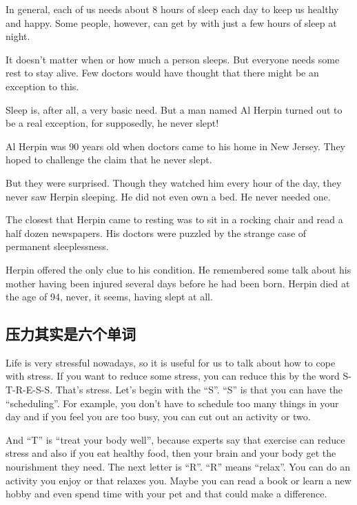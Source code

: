 In general, each of us needs about 8 hours of sleep each
day to keep us healthy and happy. Some people, however,
can get by with just a few hours of sleep at night.

It doesn't matter when or how much a person sleeps.
But everyone needs some rest to stay alive. Few doctors
would have thought that there might be an exception to this.

Sleep is, after all, a very basic need. But a man named Al
Herpin turned out to be a real exception, for supposedly,
he never slept!

Al Herpin was 90 years old when doctors
came to his home in New Jersey. They hoped to challenge
the claim that he never slept.

But they were surprised. Though they watched him every
hour of the day, they never saw Herpin sleeping. He did
not even own a bed. He never needed one.

The closest that Herpin came to resting was to sit in a
rocking chair and read a half dozen newspapers. His
doctors were puzzled by the strange case of permanent
sleeplessness.

Herpin offered the only clue to his condition. He remembered
some talk about his mother having been injured
several days before he had been born.
Herpin died at the age of 94, never, it seems, having slept
at all.
\subsection{压力其实是六个单词}
\begin{margintable}\vspace{-2cm}\footnotesize
\end{margintable}
Life is very stressful nowadays, so it is useful for us to talk
about how to cope with stress. If you want to reduce some
stress, you can reduce this by the word S-T-R-E-S-S. That's
stress. Let's begin with the “S”. “S” is that you can
have the “scheduling”. For example, you don't have to
schedule too many things in your day and if you feel you
are too busy, you can cut out an activity or two.

And “T” is “treat your body well”, because experts say
that exercise can reduce stress and also if you eat healthy
food, then your brain and your body get the nourishment
they need. The next letter is “R”. “R” means “relax”. You
can do an activity you enjoy or that relaxes you. Maybe you 
can read a book or learn a new hobby and even spend time 
with your pet and that could make a difference.

